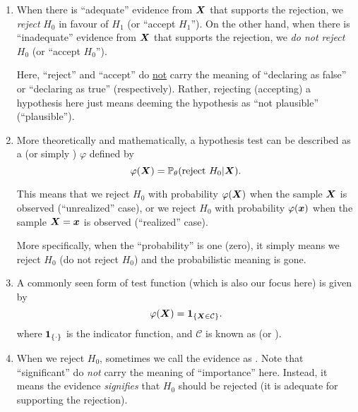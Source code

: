 \begin{enumerate}
\item When there is ``adequate'' evidence from \(\vb*{X}\) that supports the
rejection, we \emph{reject} \(H_0\) in favour of \(H_1\) (or ``accept
\(H_1\)''). On the other hand, when there is ``inadequate'' evidence from
\(\vb*{X}\) that supports the rejection, we \emph{do not reject} \(H_0\) (or
``accept \(H_0\)'').

\begin{warning}
Here, ``reject'' and ``accept'' do \underline{not} carry the meaning of
``declaring as false'' or ``declaring as true'' (respectively). Rather,
rejecting (accepting) a hypothesis here just means deeming the hypothesis as
``not plausible'' (``plausible'').
\end{warning}

\item More theoretically and mathematically, a hypothesis test can be described
as a  (or simply ) \(\varphi\) defined
by
\[
\varphi(\vb*{X})=\mathbb{P}_{\theta}\qty(\text{reject \(H_0\)}|\vb*{X}).
\]
\begin{note}
This means that we reject \(H_0\) with probability \(\varphi(\vb*{X})\) when
the sample \(\vb*{X}\) is observed (``unrealized'' case), or we reject \(H_0\)
with probability \(\varphi(\vb*{x})\) when the sample \(\vb*{X}=\vb*{x}\) is
observed (``realized'' case).

More specifically, when the ``probability'' is one (zero), it simply means we
reject \(H_0\) (do not reject \(H_0\)) and the probabilistic meaning is gone.
\end{note}

\item A commonly seen form of test function (which is also our focus here) is given
by
\[
\varphi(\vb*{X})=\mathbf{1}_{\left\{\vb*{X}\in\mathcal{C}\right\}}.
\]
where \(\mathbf{1}_{\left\{\cdot\right\}}\) is the indicator function, and \(\mathcal{C}\) is
known as  (or ).


\item When we reject \(H_0\), sometimes we call the evidence as
. Note that ``significant'' do \emph{not} carry
the meaning of ``importance'' here. Instead, it means the evidence
\emph{signifies} that \(H_0\) should be rejected (it is adequate for supporting
the rejection).


\end{enumerate}
